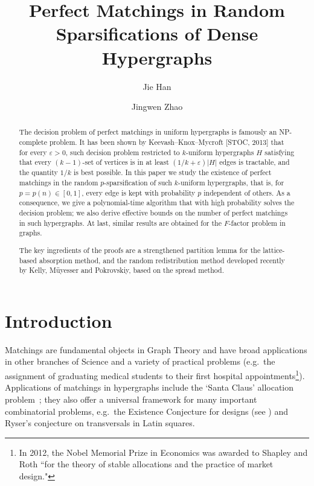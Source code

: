 \documentclass[11pt, letterpaper]{amsart}
\theoremstyle{plain}
\numberwithin{equation}{section}
\theoremstyle{definition}
\begin{document}
    

\title{Perfect Matchings in Random Sparsifications of Dense Hypergraphs}
\author{Jie Han}
\author{Jingwen Zhao}
\address{School of Mathematics and Statistics and Center of Applied Mathematics, Beijing Institute of Technology, Beijing, China, 100081. 
Email: {\tt \{han.jie|jingwen.zhao\}@bit.edu.cn}.}
\maketitle

\begin{abstract}
The decision problem of perfect matchings in uniform hypergraphs is famously an NP-complete problem.
It has been shown by Keevash--Knox--Mycroft [STOC, 2013] that for every $\varepsilon>0$, such decision problem restricted to $k$-uniform hypergraphs $H$ satisfying that every $(k-1)$-set of vertices is in at least $(1/k+\varepsilon)|H|$ edges is tractable, and the quantity $1/k$ is best possible.
In this paper we study the existence of perfect matchings in the random $p$-sparsification of such $k$-uniform hypergraphs, that is, for $p=p(n)\in [0,1]$, every edge is kept with probability $p$ independent of others.
As a consequence, we give a polynomial-time algorithm that with high probability solves the decision problem; we also derive effective bounds on the number of perfect matchings in such hypergraphs.
At last, similar results are obtained for the $F$-factor problem in graphs.

The key ingredients of the proofs are a strengthened partition lemma for the lattice-based absorption method, and the random redistribution method developed recently by Kelly, M\"uyesser and Pokrovskiy, based on the spread method.
\end{abstract}


\section{Introduction}
Matchings are fundamental objects in Graph Theory and have broad applications in other branches of Science and a variety of practical problems
(e.g.\ the assignment of graduating medical students to their first hospital appointments\footnote{In 2012, the Nobel Memorial Prize in Economics was awarded to Shapley and Roth ``for the theory of stable allocations and the practice of market design."}).
Applications of matchings in hypergraphs 
include the `Santa Claus' allocation problem~\cite{santa_claus};
they also offer a universal framework for many 
important combinatorial problems, e.g.\ the Existence Conjecture 
for designs (see \cite{Keevash_design, GKLO}) and
Ryser's conjecture \cite{ryser} on transversals in Latin squares.
\end{document}
